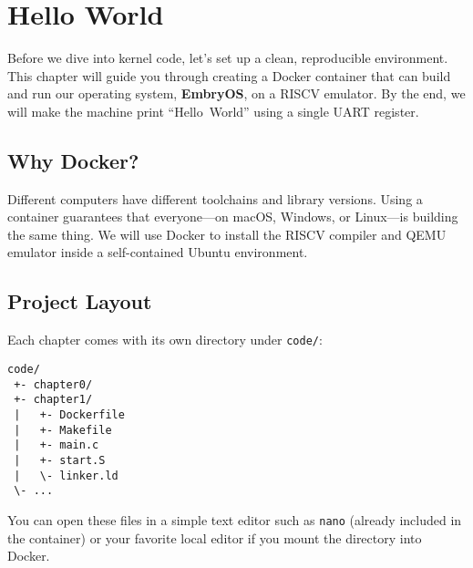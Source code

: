 \chapter{Hello World}

Before we dive into kernel code, let's set up a clean, reproducible environment.
This chapter will guide you through creating a Docker container that can build
and run our operating system, \textbf{EmbryOS}, on a RISC\textendash V
emulator.  By the end, we will make the machine print ``Hello~World'' using a
single UART register.

\section{Why Docker?}

Different computers have different toolchains and library versions.  Using a
container guarantees that everyone---on macOS, Windows, or Linux---is building
the same thing.  We will use Docker to install the RISC\textendash V compiler
and QEMU emulator inside a self-contained Ubuntu environment.

\section{Project Layout}

Each chapter comes with its own directory under \texttt{code/}:

\begin{verbatim}
code/
 +- chapter0/
 +- chapter1/
 |   +- Dockerfile
 |   +- Makefile
 |   +- main.c
 |   +- start.S
 |   \- linker.ld
 \- ...
\end{verbatim}

You can open these files in a simple text editor such as \texttt{nano} (already
included in the container) or your favorite local editor if you mount the
directory into Docker.





